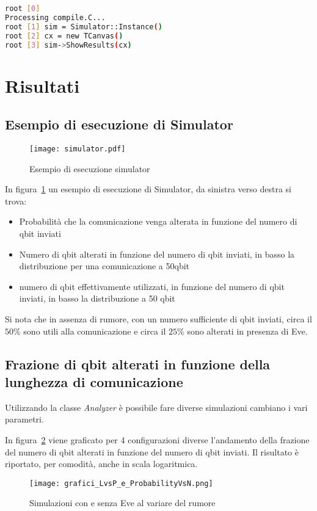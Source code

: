 \documentclass[11 pt, a4paper]{article}
\begin{document}
\begin{lstlisting}[language=bash, style=myRoot]
root [0] 
Processing compile.C...
root [1] sim = Simulator::Instance()
root [2] cx = new TCanvas()
root [3] sim->ShowResults(cx)
\end{lstlisting}

\clearpage
\section{Risultati}
\subsection{Esempio di esecuzione di Simulator}

\begin{figure}[htb!]
\centering
\texttt{[image: simulator.pdf]}
\caption{Esempio di esecuzione simulator}
\label{fig:simulator}
\end{figure}

In figura~\ref{fig:simulator} un esempio di esecuzione di Simulator, da sinistra verso destra si trova:
\begin{itemize}
\item Probabilità che la comunicazione venga alterata in funzione del numero di qbit inviati
\item Numero di qbit alterati in funzione del numero di qbit inviati, in basso la distribuzione per una comunicazione a 50qbit
\item numero di qbit effettivamente utilizzati, in funzione del numero di qbit inviati, in basso la distribuzione a 50 qbit
\end{itemize}

Si nota che in assenza di rumore, con un numero sufficiente di qbit inviati, circa il $50\%$ sono utili alla comunicazione e circa il $25\%$ sono alterati in presenza di Eve.

\clearpage
\subsection{Frazione di qbit alterati in funzione della lunghezza di comunicazione}
Utilizzando la classe \textit{Analyzer} è possibile fare diverse simulazioni cambiano i vari parametri.

In figura~\ref{fig:grafici_LvsP_e_ProbabilityVsN} viene graficato per 4 configurazioni diverse l'andamento della frazione del numero di qbit alterati in funzione del numero di qbit inviati. Il risultato è riportato, per comodità, anche in scala logaritmica.
\begin{figure}[htb!]
\centering
\texttt{[image: grafici\_LvsP\_e\_ProbabilityVsN.png]}
\caption{Simulazioni con e senza Eve al variare del rumore}
\label{fig:grafici_LvsP_e_ProbabilityVsN}
\end{figure}
\end{document}
